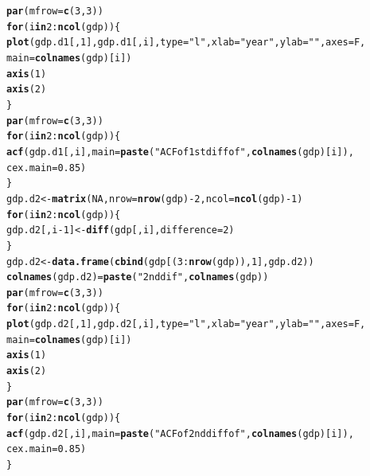 \documentclass[12pt]{article}\usepackage[]{graphicx}\usepackage[]{color}
\makeatletter
\newcommand{\hlnum}[1]{\textcolor[rgb]{0.686,0.059,0.569}{#1}}%
\newcommand{\hlstr}[1]{\textcolor[rgb]{0.192,0.494,0.8}{#1}}%
\newcommand{\hlopt}[1]{\textcolor[rgb]{0,0,0}{#1}}%
\newcommand{\hlstd}[1]{\textcolor[rgb]{0.345,0.345,0.345}{#1}}%
\newcommand{\hlkwa}[1]{\textcolor[rgb]{0.161,0.373,0.58}{\textbf{#1}}}%
\newcommand{\hlkwb}[1]{\textcolor[rgb]{0.69,0.353,0.396}{#1}}%
\newcommand{\hlkwc}[1]{\textcolor[rgb]{0.333,0.667,0.333}{#1}}%
\newcommand{\hlkwd}[1]{\textcolor[rgb]{0.737,0.353,0.396}{\textbf{#1}}}%
\newenvironment{kframe}{%
 \def\at@end@of@kframe{}%
 \ifinner\ifhmode%
  \def\at@end@of@kframe{\end{minipage}}%
  \begin{minipage}{\columnwidth}%
 \fi\fi%
 \def\FrameCommand##1{\hskip\@totalleftmargin \hskip-\fboxsep
 \colorbox{shadecolor}{##1}\hskip-\fboxsep
     \hskip-\linewidth \hskip-\@totalleftmargin \hskip\columnwidth}%
 \MakeFramed {\advance\hsize-\width
   \@totalleftmargin\z@ \linewidth\hsize
   \@setminipage}}%
 {\par\unskip\endMakeFramed%
 \at@end@of@kframe}
\newenvironment{knitrout}{}{} %
\makeatother
\begin{document}
\begin{knitrout}
\begin{kframe}
\begin{alltt}
\hlkwd{par}\hlstd{(}\hlkwc{mfrow} \hlstd{=} \hlkwd{c}\hlstd{(}\hlnum{3}\hlstd{,} \hlnum{3}\hlstd{))}
\hlkwa{for} \hlstd{(i} \hlkwa{in} \hlnum{2}\hlopt{:} \hlkwd{ncol}\hlstd{(gdp)) \{}
  \hlkwd{plot}\hlstd{(gdp.d1[,} \hlnum{1}\hlstd{], gdp.d1[, i],} \hlkwc{type} \hlstd{=} \hlstr{"l"}\hlstd{,} \hlkwc{xlab} \hlstd{=} \hlstr{"year"}\hlstd{,} \hlkwc{ylab} \hlstd{=} \hlstr{" "}\hlstd{,} \hlkwc{axes} \hlstd{= F,}
       \hlkwc{main} \hlstd{=} \hlkwd{colnames}\hlstd{(gdp)[i])}
  \hlkwd{axis}\hlstd{(}\hlnum{1}\hlstd{)}
  \hlkwd{axis}\hlstd{(}\hlnum{2}\hlstd{)}
\hlstd{\}}
\hlkwd{par}\hlstd{(}\hlkwc{mfrow} \hlstd{=} \hlkwd{c}\hlstd{(}\hlnum{3}\hlstd{,}\hlnum{3}\hlstd{))}
\hlkwa{for} \hlstd{(i} \hlkwa{in} \hlnum{2}\hlopt{:} \hlkwd{ncol}\hlstd{(gdp)) \{}
  \hlkwd{acf}\hlstd{(gdp.d1[, i],} \hlkwc{main} \hlstd{=} \hlkwd{paste}\hlstd{(}\hlstr{"ACF of 1st diff of"}\hlstd{,} \hlkwd{colnames}\hlstd{(gdp)[i]),}
      \hlkwc{cex.main} \hlstd{=} \hlnum{0.85}\hlstd{)}
\hlstd{\}}
\hlstd{gdp.d2} \hlkwb{<-} \hlkwd{matrix}\hlstd{(}\hlnum{NA}\hlstd{,} \hlkwc{nrow} \hlstd{=} \hlkwd{nrow}\hlstd{(gdp)} \hlopt{-} \hlnum{2}\hlstd{,} \hlkwc{ncol} \hlstd{=} \hlkwd{ncol}\hlstd{(gdp)} \hlopt{-} \hlnum{1}\hlstd{)}
\hlkwa{for} \hlstd{(i} \hlkwa{in} \hlnum{2}\hlopt{:} \hlkwd{ncol}\hlstd{(gdp)) \{}
  \hlstd{gdp.d2[, i} \hlopt{-} \hlnum{1}\hlstd{]} \hlkwb{<-} \hlkwd{diff}\hlstd{(gdp[, i],} \hlkwc{difference} \hlstd{=} \hlnum{2}\hlstd{)}
\hlstd{\}}
\hlstd{gdp.d2} \hlkwb{<-} \hlkwd{data.frame}\hlstd{(}\hlkwd{cbind}\hlstd{(gdp[(}\hlnum{3}\hlopt{:} \hlkwd{nrow}\hlstd{(gdp)),} \hlnum{1}\hlstd{], gdp.d2))}
\hlkwd{colnames}\hlstd{(gdp.d2)} \hlkwb{=} \hlkwd{paste}\hlstd{(}\hlstr{"2nd dif"}\hlstd{,} \hlkwd{colnames}\hlstd{(gdp))}
\hlkwd{par}\hlstd{(}\hlkwc{mfrow} \hlstd{=} \hlkwd{c}\hlstd{(}\hlnum{3}\hlstd{,} \hlnum{3}\hlstd{))}
\hlkwa{for} \hlstd{(i} \hlkwa{in} \hlnum{2}\hlopt{:} \hlkwd{ncol}\hlstd{(gdp)) \{}
  \hlkwd{plot}\hlstd{(gdp.d2[,} \hlnum{1}\hlstd{], gdp.d2[, i],} \hlkwc{type} \hlstd{=} \hlstr{"l"}\hlstd{,} \hlkwc{xlab} \hlstd{=} \hlstr{"year"}\hlstd{,} \hlkwc{ylab} \hlstd{=} \hlstr{" "}\hlstd{,} \hlkwc{axes} \hlstd{= F,}
       \hlkwc{main} \hlstd{=} \hlkwd{colnames}\hlstd{(gdp)[i])}
  \hlkwd{axis}\hlstd{(}\hlnum{1}\hlstd{)}
  \hlkwd{axis}\hlstd{(}\hlnum{2}\hlstd{)}
\hlstd{\}}
\hlkwd{par}\hlstd{(}\hlkwc{mfrow} \hlstd{=} \hlkwd{c}\hlstd{(}\hlnum{3}\hlstd{,}\hlnum{3}\hlstd{))}
\hlkwa{for} \hlstd{(i} \hlkwa{in} \hlnum{2}\hlopt{:} \hlkwd{ncol}\hlstd{(gdp)) \{}
  \hlkwd{acf}\hlstd{(gdp.d2[, i],} \hlkwc{main} \hlstd{=} \hlkwd{paste}\hlstd{(}\hlstr{"ACF of 2nd diff of"}\hlstd{,} \hlkwd{colnames}\hlstd{(gdp)[i]),}
      \hlkwc{cex.main} \hlstd{=} \hlnum{0.85}\hlstd{)}
\hlstd{\}}
\end{alltt}
\end{kframe}
\end{knitrout}



\end{document}
